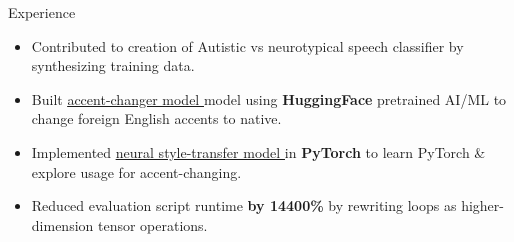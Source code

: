 \documentclass{resume} %
\begin{document}
\begin{workSection}{Experience}
	\experienceItem[
	company=UTEP,
	location=El Paso{,} TX,
	position=Undergraduate Research Assistant,
	duration=January 2024 - May 2024,
	]
	\begin{itemize}
		\vspace{-0.5em}
		\itemsep -6pt {}
		\item Contributed to creation of Autistic vs neurotypical speech classifier by
		synthesizing training data.
		\item Built \href{https://github.com/AshkanArabim/accent-change-paper-implementation}{\underline{accent-changer model \faExternalLink}} model using \textbf{HuggingFace} pretrained AI/ML to change foreign English accents to native.
		\item Implemented \href{https://github.com/AshkanArabim/neural-style-transfer}{\underline{neural style-transfer model \faExternalLink}} in \textbf{PyTorch} to learn PyTorch \& explore usage for accent-changing.
       \item Reduced evaluation script runtime 
			 \textbf{by 14400\%} 
			 by rewriting loops as higher-dimension tensor operations.
	\end{itemize}
	


\end{workSection}
\end{document}
